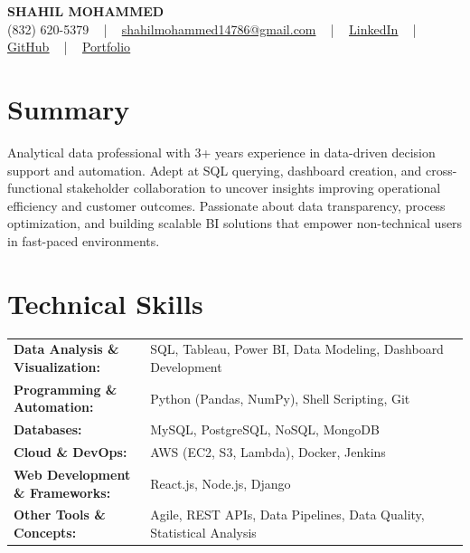 \documentclass[letterpaper,11pt]{article}
\begin{document}
\begin{center}
    {\fontsize{14pt}{12pt}\selectfont \textbf{\MakeUppercase{Shahil Mohammed}}}\\ \vspace{2pt}
    \fontsize{10pt}{12pt}\selectfont (832) 620-5379 ~ | ~ \href{mailto:shahilmohammed14786@gmail.com}{shahilmohammed14786@gmail.com} ~ | ~  
    \href{https://www.linkedin.com/in/shahil-mohammed-9652931a1/}{\color{blue}\underline{LinkedIn}}  ~ | ~ 
    \href{https://github.com/freakbeast14}{\color{blue}\underline{GitHub}} ~ | ~ 
    \href{https://shahil-mohammed.netlify.app/}{\color{blue}\underline{Portfolio}}
    \vspace{-8pt}
\end{center}

\section{Summary}
\fontsize{9pt}{10pt}\selectfont
Analytical data professional with 3+ years experience in data-driven decision support and automation. Adept at SQL querying, dashboard creation, and cross-functional stakeholder collaboration to uncover insights improving operational efficiency and customer outcomes. Passionate about data transparency, process optimization, and building scalable BI solutions that empower non-technical users in fast-paced environments.
 \vspace{-5pt}
 
\section{Technical Skills}
        \vspace{-14pt}
        \begin{table}[h]
            \fontsize{9pt}{10pt}\selectfont
            \begin{tabular}{p{0.3\linewidth} p{0.7\linewidth}}
                \textbf{Data Analysis \& Visualization:} & SQL, Tableau, Power BI, Data Modeling, Dashboard Development \\
                \textbf{Programming \& Automation:} & Python (Pandas, NumPy), Shell Scripting, Git \\
                \textbf{Databases:} & MySQL, PostgreSQL, NoSQL, MongoDB \\
                \textbf{Cloud \& DevOps:} & AWS (EC2, S3, Lambda), Docker, Jenkins \\
                \textbf{Web Development \& Frameworks:} & React.js, Node.js, Django \\
                \textbf{Other Tools \& Concepts:} & Agile, REST APIs, Data Pipelines, Data Quality, Statistical Analysis \\
            \end{tabular}
        \end{table}
 \vspace{-15pt}
 
\end{document}
